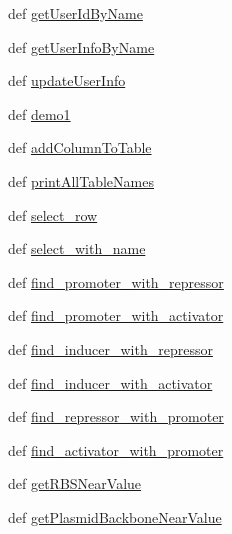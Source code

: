 \begin{DoxyCompactItemize}
\item 
def \hyperlink{classweb_1_1database_1_1_sqlite_database_adcd7db98f8fa2f1605047fa1da83be24}{get\-User\-Id\-By\-Name}
\item 
def \hyperlink{classweb_1_1database_1_1_sqlite_database_a6cb7b4acac40f09a21d38db605f1d725}{get\-User\-Info\-By\-Name}
\item 
def \hyperlink{classweb_1_1database_1_1_sqlite_database_aefe86fc2fe5bb4e9d4ed821ad789d93e}{update\-User\-Info}
\item 
def \hyperlink{classweb_1_1database_1_1_sqlite_database_a3873dfe7f76b813b9b3e3f7070a9e49c}{demo1}
\item 
def \hyperlink{classweb_1_1database_1_1_sqlite_database_a3f6909cf13ccb28d94be7100b6d1c6a6}{add\-Column\-To\-Table}
\item 
def \hyperlink{classweb_1_1database_1_1_sqlite_database_a6a94e47f3902345d6408e1e1442f8e2a}{print\-All\-Table\-Names}
\item 
def \hyperlink{classweb_1_1database_1_1_sqlite_database_a70d73e7e4456d5ce68036ff2c0bd9f87}{select\-\_\-row}
\item 
def \hyperlink{classweb_1_1database_1_1_sqlite_database_ade9bdb42860b95b3e0fe120a6eeef4af}{select\-\_\-with\-\_\-name}
\item 
def \hyperlink{classweb_1_1database_1_1_sqlite_database_ab7c8a4c22540ce6b4b1e6d79cac67b4d}{find\-\_\-promoter\-\_\-with\-\_\-repressor}
\item 
def \hyperlink{classweb_1_1database_1_1_sqlite_database_ac678393becbc9e9d71b798ee60359f55}{find\-\_\-promoter\-\_\-with\-\_\-activator}
\item 
def \hyperlink{classweb_1_1database_1_1_sqlite_database_a95c0d26c702c228f1d199af67bb2e2fc}{find\-\_\-inducer\-\_\-with\-\_\-repressor}
\item 
def \hyperlink{classweb_1_1database_1_1_sqlite_database_a8be37eb55c947350ceef6cc46348a79d}{find\-\_\-inducer\-\_\-with\-\_\-activator}
\item 
def \hyperlink{classweb_1_1database_1_1_sqlite_database_aa4cfc1fba6a00dee60d72c03ddaff46e}{find\-\_\-repressor\-\_\-with\-\_\-promoter}
\item 
def \hyperlink{classweb_1_1database_1_1_sqlite_database_ad94db33566965cb5458a1a6470214abb}{find\-\_\-activator\-\_\-with\-\_\-promoter}
\item 
def \hyperlink{classweb_1_1database_1_1_sqlite_database_ac7f96c047c5b0205fb847511bef7f671}{get\-R\-B\-S\-Near\-Value}
\item 
def \hyperlink{classweb_1_1database_1_1_sqlite_database_a76974e387adbcd53d912f7375e432106}{get\-Plasmid\-Backbone\-Near\-Value}

\end{DoxyCompactItemize}
